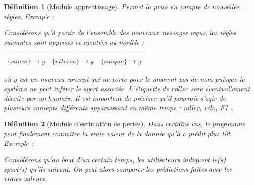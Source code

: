 \documentclass[utf8]{stageM2R} %
\newtheorem{mydef}{Définition}
\theoremstyle{remark}
\newenvironment{exemple}{%
\upshape Exemple :%
    \small     %
}{%
}
\begin{document}
\begin{mydef}[Module apprentissage]
\label{apprentissage}
Permet la prise en compte de nouvelles règles.
\begin{exemple}
Considérons qu'à partir de l'ensemble des nouveaux messages reçus, les règles suivantes sont apprises et ajoutées au modèle :
\begin{table}[!h]
\begin{tabular}{|l|c|c|}
	\hline
	$\{roues\}\rightarrow y$&$\{vitesse\}\rightarrow y$&$\{casque\}\rightarrow y$\\
	\hline
	\end{tabular}
\centering
\end{table}

où $y$ est un nouveau concept qui ne porte pour le moment pas de nom puisque le système ne peut inférer le sport associée. L'étiquette de $roller$ sera éventuellement décrite par un humain. Il est important de préciser qu'il pourrait s'agir de plusieurs concepts différents apparaissant en même temps : roller, vélo, F1 \dots
\end{exemple}
\end{mydef}

\begin{mydef}[Module d'estimation de pertes]
\label{estimation}
Dans certains cas, le programme peut finalement connaître la vraie valeur de la donnée qu'il a prédit plus tôt.
\begin{exemple}
Considérons qu'au bout d'un certain temps, les utilisateurs indiquent le(s) sport(s) qu'ils suivent. On peut alors comparer les prédictions faites avec les vraies valeurs.
\end{exemple}
\end{mydef}
\end{document}
